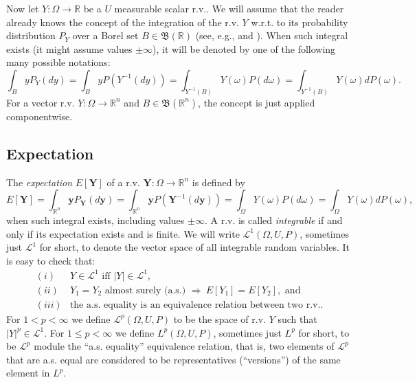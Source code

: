 Now let $Y:\Omega\rightarrow\mathbb{R}$ be a $U$ measurable scalar r.v..
We will assume that the reader already knows the concept of the
integration of the r.v. $Y$
w.r.t. to its probability distribution $P_Y$
over a Borel set $B\in\mathfrak{B}(\mathbb{R})$ (see, e.g., \cite[Section A.4]{Du05} and \cite[Chapter 9]{JaPr04}).
When such integral exists (it might assume values $\pm\infty$), it will be denoted by one of the following many possible notations:
\begin{equation*}
\int_B yP_Y(dy) = 
\int_B yP(Y^{-1}(dy)) = 
\int_{Y^{-1}(B)}Y(\omega)P(d\omega) =
\int_{Y^{-1}(B)}Y(\omega)dP(\omega).
\end{equation*}
For a vector r.v. $Y:\Omega\rightarrow\mathbb{R}^n$ and $B\in\mathfrak{B}(\mathbb{R}^n)$, the concept is just applied componentwise.

\subsection{Expectation}

The {\it expectation} $E[\mathbf{Y}]$ of a r.v. $\mathbf{Y}:\Omega\rightarrow\mathbb{R}^n$ is defined by
\begin{equation*}
E[\mathbf{Y}] =
\int_{\mathbb{R}^n} \mathbf{y}P_\mathbf{Y}(d\mathbf{y}) = 
\int_{\mathbb{R}^n} \mathbf{y}P(\mathbf{Y}^{-1}(d\mathbf{y})) = 
\int_{\Omega}Y(\omega)P(d\omega) =
\int_{\Omega}Y(\omega)dP(\omega),
\end{equation*}
when such integral exists, including values $\pm\infty$.
A r.v. is called {\it integrable} if and only if its expectation exists and is finite.
We will write $\mathcal{L}^1(\Omega,U,P)$, sometimes just $\mathcal{L}^1$ for short, to denote the vector space of all integrable random variables.
It is easy to check that:
\[
\begin{array}{rl}
  (i) & Y\in\mathcal{L}^1\mbox{ iff }|Y|\in\mathcal{L}^1,                        \\
 (ii) & Y_1=Y_2\mbox{ almost surely (a.s.) }\Rightarrow~E[Y_1]=E[Y_2],\mbox{ and} \\
(iii) & \mbox{the a.s. equality is an equivalence relation between two r.v.}.
\end{array}
\]
For $1 < p < \infty$ we define $\mathcal{L}^p(\Omega,U,P)$ to be the space of r.v. $Y$ such that $|Y|^p\in\mathcal{L}^1$.
For $1\leqslant p < \infty$ we define $L^p(\Omega,U,P)$, sometimes just $L^p$ for short,
to be $\mathcal{L}^p$ module the ``a.s. equality'' equivalence relation, that is,
two elements of $\mathcal{L}^p$ that are a.s. equal are considered to be
representatives (``versions'') of the same element in $L^p$.

